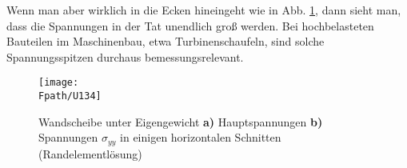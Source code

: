 Wenn man aber wirklich in die Ecken hineingeht wie in Abb. \ref{U134}, dann sieht man, dass die Spannungen in der Tat unendlich gro{\ss} werden. Bei hochbelasteten Bauteilen im Maschinenbau, etwa Turbinenschaufeln, sind solche Spannungsspitzen durchaus bemessungsrelevant.

\begin{figure}
\centering
\texttt{[image: \\Fpath/U134]}
\caption{Wandscheibe unter Eigengewicht \textbf{ a)} Hauptspannungen \textbf{ b)} Spannungen $\sigma_{yy} $ in einigen horizontalen Schnitten (Randelementl\"{o}sung)}
\label{U134}%
\end{figure}%


